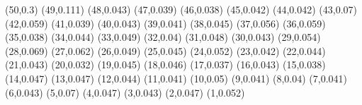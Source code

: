 (50,0.3)
(49,0.111)
(48,0.043)
(47,0.039)
(46,0.038)
(45,0.042)
(44,0.042)
(43,0.07)
(42,0.059)
(41,0.039)
(40,0.043)
(39,0.041)
(38,0.045)
(37,0.056)
(36,0.059)
(35,0.038)
(34,0.044)
(33,0.049)
(32,0.04)
(31,0.048)
(30,0.043)
(29,0.054)
(28,0.069)
(27,0.062)
(26,0.049)
(25,0.045)
(24,0.052)
(23,0.042)
(22,0.044)
(21,0.043)
(20,0.032)
(19,0.045)
(18,0.046)
(17,0.037)
(16,0.043)
(15,0.038)
(14,0.047)
(13,0.047)
(12,0.044)
(11,0.041)
(10,0.05)
(9,0.041)
(8,0.04)
(7,0.041)
(6,0.043)
(5,0.07)
(4,0.047)
(3,0.043)
(2,0.047)
(1,0.052)
